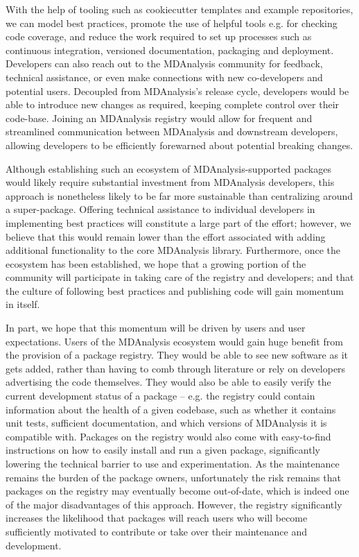 \documentclass[9pt,whitepaper]{livecoms}
\begin{document}
With the help of tooling such as cookiecutter templates and example repositories, we can model best practices, promote the use of helpful tools e.g. for checking code coverage, and reduce the work required to set up processes such as continuous integration, versioned documentation, packaging and deployment. Developers can also reach out to the MDAnalysis community for feedback, technical assistance, or even make connections with new co-developers and potential users. Decoupled from MDAnalysis’s release cycle, developers would be able to introduce new changes as required, keeping complete control over their code-base. Joining an MDAnalysis registry would allow for frequent and streamlined communication between MDAnalysis and downstream developers, allowing developers to be efficiently forewarned about potential breaking changes.

Although establishing such an ecosystem of MDAnalysis-supported packages would likely require substantial investment from MDAnalysis developers, this approach is nonetheless likely to be far more sustainable than centralizing around a super-package. Offering technical assistance to individual developers in implementing best practices will constitute a large part of the effort; however, we believe that this would remain lower than the effort associated with adding additional functionality to the core MDAnalysis library. Furthermore, once the ecosystem has been established, we hope that a growing portion of the community will participate in taking care of the registry and developers; and that the culture of following best practices and publishing code will gain momentum in itself. 

In part, we hope that this momentum will be driven by users and user expectations. Users of the MDAnalysis ecosystem would gain huge benefit from the provision of a package registry. They would be able to see new software as it gets added, rather than having to comb through literature or rely on developers advertising the code themselves. They would also be able to easily verify the current development status of a package – e.g. the registry could contain information about the health of a given codebase, such as whether it contains unit tests, sufficient documentation, and which versions of MDAnalysis it is compatible with. Packages on the registry would also come with easy-to-find instructions on how to easily install and run a given package, significantly lowering the technical barrier to use and experimentation. As the maintenance remains the burden of the package owners, unfortunately the risk remains that packages on the registry may eventually become out-of-date, which is indeed one of the major disadvantages of this approach. However, the registry significantly increases the likelihood that packages will reach users who will become sufficiently motivated to contribute or take over their maintenance and development.
\end{document}
